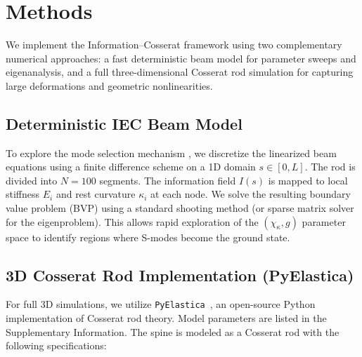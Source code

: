 \section{Methods}

We implement the Information--Cosserat framework using two complementary numerical approaches: a fast deterministic beam model for parameter sweeps and eigenanalysis, and a full three-dimensional Cosserat rod simulation for capturing large deformations and geometric nonlinearities.

\subsection{Deterministic IEC Beam Model}

To explore the mode selection mechanism , we discretize the linearized beam equations using a finite difference scheme on a 1D domain $s \in [0, L]$. The rod is divided into $N=100$ segments. The information field $I(s)$ is mapped to local stiffness $E_i$ and rest curvature $\kappa_{i}$ at each node. We solve the resulting boundary value problem (BVP) using a standard shooting method (or sparse matrix solver for the eigenproblem). This allows rapid exploration of the $(\chi_\kappa, g)$ parameter space to identify regions where S-modes become the ground state.

\subsection{3D Cosserat Rod Implementation (PyElastica)}

For full 3D simulations, we utilize \texttt{PyElastica}~\cite{pyelastica_zenodo,gazzola2018forward}, an open-source Python implementation of Cosserat rod theory. Model parameters are listed in the Supplementary Information. The spine is modeled as a Cosserat rod with the following specifications:

